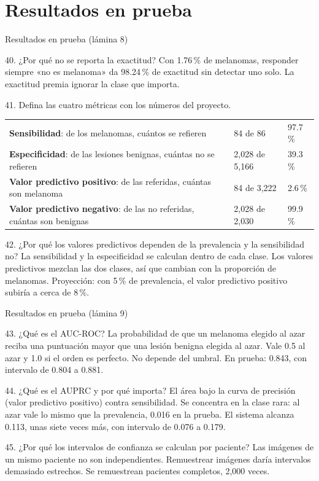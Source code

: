 \documentclass[aspectratio=169,10pt]{beamer}
\newcommand{\qa}[2]{\begin{block}{#1}\footnotesize #2\end{block}}
\begin{document}
\section{Resultados en prueba}
\begin{frame}{Resultados en prueba (lámina 8)}
  \qa{40. ¿Por qué no se reporta la exactitud?}{
    Con 1.76\,\% de melanomas, responder siempre «no es melanoma» da 98.24\,\% de exactitud sin detectar uno solo. La exactitud premia ignorar la clase que importa.}
  \qa{41. Defina las cuatro métricas con los números del proyecto.}{
    \begin{tabular}{@{}lll@{}}
      \textbf{Sensibilidad}: de los melanomas, cuántos se refieren & 84 de 86 & 97.7\,\% \\
      \textbf{Especificidad}: de las lesiones benignas, cuántas no se refieren & 2,028 de 5,166 & 39.3\,\% \\
      \textbf{Valor predictivo positivo}: de las referidas, cuántas son melanoma & 84 de 3,222 & 2.6\,\% \\
      \textbf{Valor predictivo negativo}: de las no referidas, cuántas son benignas & 2,028 de 2,030 & 99.9\,\% \\
    \end{tabular}}
  \qa{42. ¿Por qué los valores predictivos dependen de la prevalencia y la sensibilidad no?}{
    La sensibilidad y la especificidad se calculan dentro de cada clase. Los valores predictivos mezclan las dos clases, así que cambian con la proporción de melanomas. Proyección: con 5\,\% de prevalencia, el valor predictivo positivo subiría a cerca de 8\,\%.}
\end{frame}

\begin{frame}{Resultados en prueba (lámina 9)}
  \qa{43. ¿Qué es el AUC-ROC?}{
    La probabilidad de que un melanoma elegido al azar reciba una puntuación mayor que una lesión benigna elegida al azar. Vale 0.5 al azar y 1.0 si el orden es perfecto. No depende del umbral. En prueba: 0.843, con intervalo de 0.804 a 0.881.}
  \qa{44. ¿Qué es el AUPRC y por qué importa?}{
    El área bajo la curva de precisión (valor predictivo positivo) contra sensibilidad. Se concentra en la clase rara: al azar vale lo mismo que la prevalencia, 0.016 en la prueba. El sistema alcanza 0.113, unas siete veces más, con intervalo de 0.076 a 0.179.}
  \qa{45. ¿Por qué los intervalos de confianza se calculan por paciente?}{
    Las imágenes de un mismo paciente no son independientes. Remuestrear imágenes daría intervalos demasiado estrechos. Se remuestrean pacientes completos, 2,000 veces.}
\end{frame}
\end{document}

